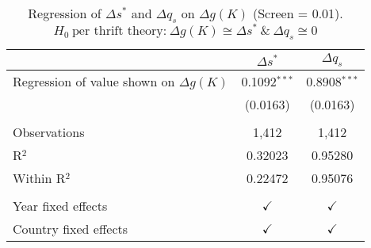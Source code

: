 \begin{table}[pos=h]
\caption{Regression of $\Delta s^*$ and $\Delta q_s$ on $\Delta g(K)$ (Screen = 0.01). $H_0\ \text{per thrift theory:} \ \Delta g(K) \cong \Delta s^* \ \& \ \Delta q_s \cong 0$}
\centering
\begin{tabularx}{\columnwidth}{lcc}
   \toprule
                                               & $\Delta s^*$   & $\Delta q_s$ \\    
   \midrule 
   Regression of value shown on $\Delta g(K)$  & 0.1092$^{***}$ & 0.8908$^{***}$\\   
                                               & (0.0163)       & (0.0163)\\   
    \\
   Observations                                & 1,412          & 1,412\\  
   R$^2$                                       & 0.32023        & 0.95280\\  
   Within R$^2$                                & 0.22472        & 0.95076\\  
    \\
   Year fixed effects                          & $\checkmark$   & $\checkmark$\\   
   Country fixed effects                       & $\checkmark$   & $\checkmark$\\   
   \bottomrule
\end{tabularx}
   \label{tbl-wid_si_table}
\end{table}